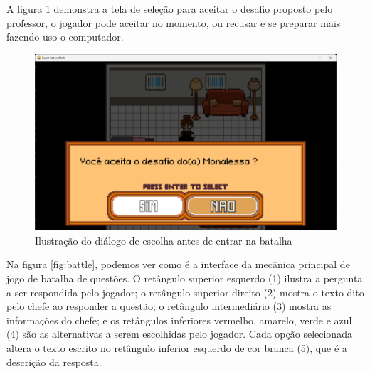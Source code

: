 A figura \ref{fig:choose-dialog} demonstra a tela de seleção para aceitar o desafio proposto pelo professor, o jogador pode aceitar no momento, ou recusar e se preparar mais fazendo uso o computador.
\begin{figure}[h!]
    \centering
    \includegraphics[width=1\linewidth]{figuras/choose-dialog.png}
    \caption{Ilustração do diálogo de escolha antes de entrar na batalha}
    \label{fig:choose-dialog}
\end{figure}

\clearpage
Na figura \ref{fig:battle}, podemos ver como é a interface da mecânica principal de jogo de batalha de questões. O retângulo superior esquerdo (1) ilustra a pergunta a ser respondida pelo jogador; o retângulo superior direito (2) mostra o texto dito pelo chefe ao responder a questão; o retângulo intermediário (3) mostra as informações do chefe; e os retângulos inferiores vermelho, amarelo, verde e azul (4) são as alternativas a serem escolhidas pelo jogador. Cada opção selecionada altera o texto escrito no retângulo inferior esquerdo de cor branca (5), que é a descrição da resposta. 

